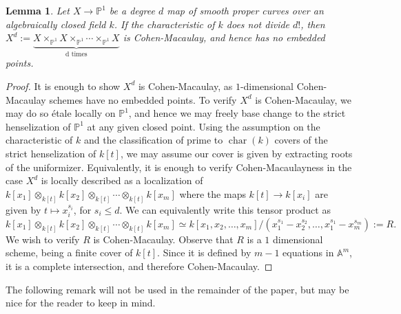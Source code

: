 \documentclass[12 pt]{amsart}
\newcommand{\rboxed}[1]{#1}
\theoremstyle{plain}
\newtheorem{lemma}[theorem]{Lemma}
\theoremstyle{definition}
\theoremstyle{remark}
\numberwithin{equation}{section}
\newcommand\ba{\mathbb A}
\newcommand\bp{\mathbb P}
\DeclareMathOperator\chr{\operatorname{char}}
\begin{document}
\begin{lemma}
	\label{lemma:no-associated-points} Let $X \to \bp^1$ be a degree $d$ map
	of smooth proper curves over an algebraically closed field $k$.  If the
	characteristic of $k$ does not divide $d!$, then $\rboxed{X^d} :=
	\underbrace{X \times_{\bp^1} X \times_{\bp^1} \cdots \times_{\bp^1}
X}_{\text{d times}}$ is Cohen-Macaulay, and hence has no embedded points.  \end{lemma} 
\begin{proof}
	It is enough to show $X^d$ is Cohen-Macaulay, as $1$-dimensional
	Cohen-Macaulay schemes have no embedded points.
	To verify $X^d$ is Cohen-Macaulay, we may do so \'etale locally on $\bp^1$, and
		hence we may freely base change to the strict henselization of
		$\bp^1$ at any given closed point.  Using the assumption on the
		characteristic of $k$ and the classification of prime to
		$\chr(k)$ covers of the strict henselization of $k[t]$, we may
		assume our cover is given by extracting roots of the
		uniformizer.  Equivalently, it is enough to verify
		Cohen-Macaulayness 
		in the case $X^d$ is locally described as a localization of
		$k[x_1] \otimes_{k[t]} k[x_2] \otimes_{k[t]} \cdots
		\otimes_{k[t]} k[x_m]$ where the maps $k[t] \to k[x_i]$ are
		given by $t \mapsto x_i^{s_i}$, for $s_i \leq d$.  We can
		equivalently write this tensor product as $k[x_1] \otimes_{k[t]}
		k[x_2] \otimes_{k[t]} \cdots \otimes_{k[t]} k[x_m] \simeq
		k[x_1,x_2, \ldots, x_m]/(x_1^{s_1} - x_2^{s_2}, \ldots,
		x_1^{s_1} - x_m^{s_m}) := R.$ We wish to verify $R$ is
		Cohen-Macaulay.  
		Observe that $R$ is a $1$ dimensional scheme,
		being a finite cover of $k[t]$.  Since it is defined by $m-1$
		equations in $\ba^m$, it is a complete intersection, and
		therefore Cohen-Macaulay.  
\end{proof}
The following remark will not be used in the remainder of the paper, but may be
nice for the reader to keep in mind.
\end{document}
